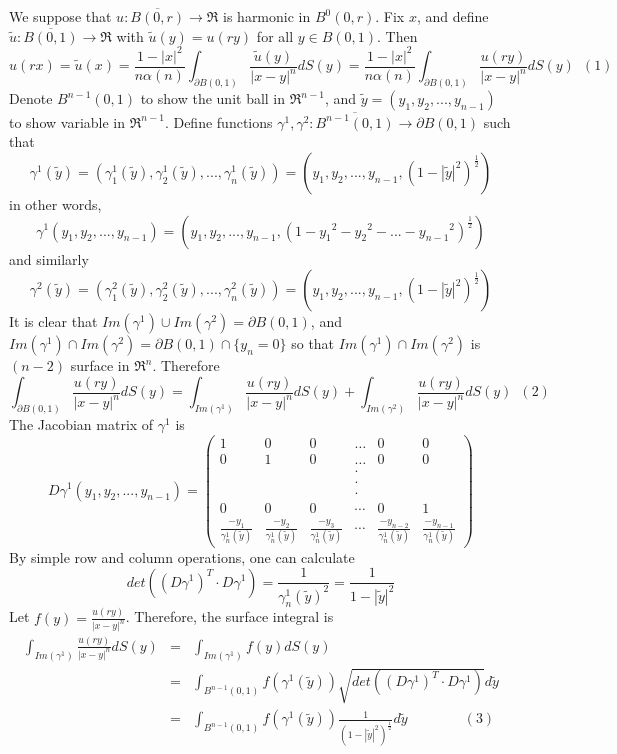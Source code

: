 \documentclass[a4paper,10pt]{article}
\begin{document}
We suppose that $u:\overline{B(0,r)} \rightarrow \Re$ is harmonic in $B^{0}(0,r)$. Fix $x$, and define $\tilde{u}:\overline{B(0,1)} \rightarrow \Re$ with $\tilde{u}(y)=u(ry)$ for all $y\in B(0,1) $. Then $$u(rx)=\tilde{u}(x)=\frac{1-|x|^2}{n\alpha(n)}\int_{\partial B(0,1)}\frac{\tilde{u}(y)}{|x-y|^n}dS(y)=\frac{1-|x|^2}{n\alpha(n)}\int_{\partial B(0,1)}\frac{u(ry)}{|x-y|^n}dS(y) \,\,\,(1)$$
Denote $B^{n-1}(0,1)$ to show the unit ball in $\Re^{n-1}$, and $\tilde{y}=(y_1,y_2,...,y_{n-1})$ to show variable in $\Re^{n-1}$.
Define functions $\gamma^1 , \gamma^2 : \overline{B^{n-1}(0,1)}\rightarrow \partial B(0,1)$ such that
$$\gamma^1(\tilde{y})=(\gamma^1_1(\tilde{y}),\gamma^1_2(\tilde{y}),...,\gamma^1_n(\tilde{y}))=(y_1,y_2,...,y_{n-1},(1-|\tilde{y}|^2)^{\frac{1}{2}})$$
in other words,  $$\gamma^1(y_1,y_2,...,y_{n-1})=(y_1,y_2,...,y_{n-1},(1-{y_1}^2-{y_2}^2-...-{y_{n-1}}^2)^{\frac{1}{2}})$$ and similarly $$\gamma^2(\tilde{y})=(\gamma^2_1(\tilde{y}),\gamma^2_2(\tilde{y}),...,\gamma^2_n(\tilde{y}))=(y_1,y_2,...,y_{n-1},(1-|\tilde{y}|^2)^{\frac{1}{2}})$$ It is clear that $Im(\gamma^1)\cup Im(\gamma^2)=\partial B(0,1)$, and $Im(\gamma^1)\cap Im(\gamma^2)=\partial B(0,1)\cap\{y_n=0\}$ so that $Im(\gamma^1)\cap Im(\gamma^2)$ is $(n-2)$ surface in $ \Re^n$. Therefore $$\int_{\partial B(0,1)}\frac{u(ry)}{|x-y|^n}dS(y)=\int_{Im(\gamma^1)}\frac{u(ry)}{|x-y|^n}dS(y)+\int_{Im(\gamma^2)}\frac{u(ry)}{|x-y|^n}dS(y)\,\,\,(2)$$
The Jacobian matrix of $\gamma^1$ is $$D\gamma^1(y_1,y_2,...,y_{n-1})=\begin{pmatrix}1& 0& 0& \dots &0 & 0\\ 0& 1& 0 & \dots& 0&0 \\ & & & \cdot \\& & &  \cdot\\& & & \cdot\\0& 0& 0& \cdots& 0& 1 \\ \frac{-y_1}{\gamma^1_n(\tilde{y})} & \frac{-y_2}{\gamma^1_n(\tilde{y})} & \frac{-y_3}{\gamma^1_n(\tilde{y})} & \cdots & \frac{-y_{n-2}}{\gamma^1_n(\tilde{y})} & \frac{-y_{n-1}}{\gamma^1_n(\tilde{y})}
\end{pmatrix}$$ 
By simple  row and column operations, one can calculate $$det((D\gamma^1) ^T \cdot D\gamma^1)=\frac{1}{\gamma^1_n(\tilde{y})^2}=\frac{1}{1-|\tilde{y}|^2} $$ Let $f(y)=\frac{u(ry)}{|x-y|^n}$. Therefore, the surface integral is
\begin{eqnarray*}	\int_{Im(\gamma^1)}\frac{u(ry)}{|x-y|^n}dS(y)	&=&\int_{Im(\gamma^1)}f(y)dS(y)\\
&=&\int_{B^{n-1}(0,1)}f(\gamma^1(\tilde{y}))\sqrt{det((D\gamma^1) ^T \cdot D\gamma^1)}d\tilde{y}\\
&=&\int_{B^{n-1}(0,1)}f(\gamma^1(\tilde{y}))\frac{1}{(1-|\tilde{y}|^2)^{\frac{1}{2}}} d\tilde{y}   \qquad \qquad  (3) 
\end{eqnarray*}
\end{document}
